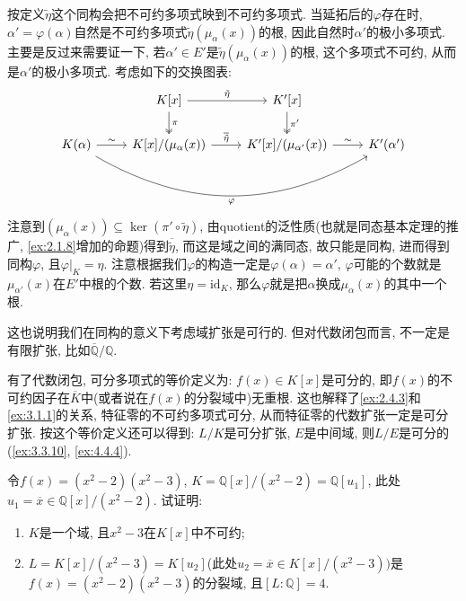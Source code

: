 \begin{remark}
    按定义$\tilde{\eta}$这个同构会把不可约多项式映到不可约多项式. 当延拓后的$\varphi$存在时, $\alpha' = \varphi(\alpha)$自然是不可约多项式$\tilde{\eta}(\mu_\alpha(x))$的根, 因此自然时$\alpha'$的极小多项式. 主要是反过来需要证一下, 若$\alpha' \in E'$是$\tilde{\eta}(\mu_\alpha(x))$的根, 这个多项式不可约, 从而是$\alpha'$的极小多项式. 考虑如下的交换图表:
    \[
        \begin{tikzcd}
            & {K[x]} \arrow[d, "\pi", two heads] \arrow[r, "\tilde{\eta}"]       & {K'[x]} \arrow[d, "\pi'", two heads]                 &            \\
K(\alpha) \arrow[r, "\sim"] \arrow[rrr, "\varphi"', bend right] & {K[x]/(\mu_\alpha(x))} \arrow[r, "\overline{\tilde{\eta}}"] & {K'[x]/(\mu_{\alpha'}(x))} \arrow[r, "\sim"] & K'(\alpha')
        \end{tikzcd}
    \]
    注意到$(\mu_\alpha(x)) \subseteq \ker(\pi' \circ \tilde{\eta})$, 由quotient的泛性质(也就是同态基本定理的推广, \ref{ex:2.1.8}增加的命题)得到$\overline{\tilde{\eta}}$, 而这是域之间的满同态, 故只能是同构, 进而得到同构$\varphi$, 且$\varphi|_K = \eta$. 注意根据我们$\varphi$的构造一定是$\varphi(\alpha) = \alpha'$, $\varphi$可能的个数就是$\mu_{\alpha'}(x)$在$E'$中根的个数. 若这里$\eta = \mathrm{id}_K$, 那么$\varphi$就是把$\alpha$换成$\mu_\alpha(x)$的其中一个根.

    这也说明我们在同构的意义下考虑域扩张是可行的. 但对代数闭包而言, 不一定是有限扩张, 比如$\overline{\mathbb{Q}}/\mathbb{Q}$.

    有了代数闭包, 可分多项式的等价定义为: $f(x) \in K[x]$是可分的, 即$f(x)$的不可约因子在$\overline{K}$中(或者说在$f(x)$的分裂域中)无重根. 这也解释了\ref{ex:2.4.3}和\ref{ex:3.1.1}的关系, 特征零的不可约多项式可分, 从而特征零的代数扩张一定是可分扩张. 按这个等价定义还可以得到: $L/K$是可分扩张, $E$是中间域, 则$L/E$是可分的(\ref{ex:3.3.10}, \ref{ex:4.4.4}).
\end{remark}

\begin{problem}
    令$f(x) = (x^2 - 2)(x^2 - 3)$, $K = \mathbb{Q}[x]/(x^2 - 2) = \mathbb{Q}[u_1]$, 此处$u_1 = \overline{x} \in \mathbb{Q}[x]/(x^2 - 2)$. 试证明: 
    \begin{enumerate}[(1)]
        \item $K$是一个域, 且$x^2 - 3$在$K[x]$中不可约;
        \item $L = K[x]/(x^2 - 3) = K[u_2]$(此处$u_2 = \overline{x} \in K[x]/(x^2 - 3))$是$f(x) = (x^2 - 2)(x^2 - 3)$的分裂域, 且$[L:\mathbb{Q}] = 4$.
    \end{enumerate}
\end{problem}

